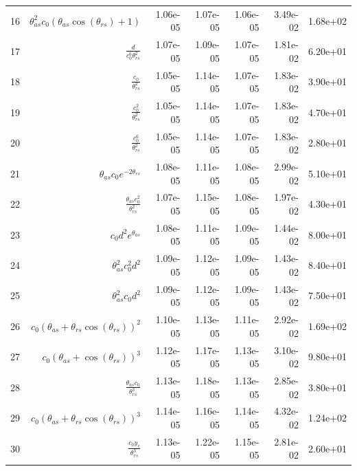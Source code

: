 \begin{tabularx}{\textwidth}{lRRRRRl}
16  &  $ \theta_{as}^{2} c_{0} \left(\theta_{as} \cos{\left(\theta_{rs} \right)} + 1\right) $  &  1.06e-05  &  1.07e-05  &  1.06e-05  &  3.49e-02  &  1.68e+02  \\ 
17  &  $ \displaystyle\frac{d}{c_{0}^{6} \theta_{rs}^{2}} $  &  1.07e-05  &  1.09e-05  &  1.07e-05  &  1.81e-02  &  6.20e+01  \\ 
18  &  $ \displaystyle\frac{c_{0}}{\theta_{rs}^{2}} $  &  1.05e-05  &  1.14e-05  &  1.07e-05  &  1.83e-02  &  3.90e+01  \\ 
19  &  $ \displaystyle\frac{c_{0}^{2}}{\theta_{rs}^{2}} $  &  1.05e-05  &  1.14e-05  &  1.07e-05  &  1.83e-02  &  4.70e+01  \\ 
20  &  $ \displaystyle\frac{c_{0}^{6}}{\theta_{rs}^{2}} $  &  1.05e-05  &  1.14e-05  &  1.07e-05  &  1.83e-02  &  2.80e+01  \\ 
21  &  $ \theta_{as} c_{0} e^{- 2 \theta_{rs}} $  &  1.08e-05  &  1.11e-05  &  1.08e-05  &  2.99e-02  &  5.10e+01  \\ 
22  &  $ \displaystyle\frac{\theta_{as} c_{0}^{2}}{\theta_{rs}^{2}} $  &  1.07e-05  &  1.15e-05  &  1.08e-05  &  1.97e-02  &  4.30e+01  \\ 
23  &  $ c_{0} d^{2} e^{\theta_{as}} $  &  1.08e-05  &  1.11e-05  &  1.09e-05  &  1.44e-02  &  8.00e+01  \\ 
24  &  $ \theta_{as}^{2} c_{0}^{2} d^{2} $  &  1.09e-05  &  1.12e-05  &  1.09e-05  &  1.43e-02  &  8.40e+01  \\ 
25  &  $ \theta_{as}^{2} c_{0} d^{2} $  &  1.09e-05  &  1.12e-05  &  1.09e-05  &  1.43e-02  &  7.50e+01  \\ 
26  &  $ c_{0} \left(\theta_{as} + \theta_{rs} \cos{\left(\theta_{rs} \right)}\right)^{2} $  &  1.10e-05  &  1.13e-05  &  1.11e-05  &  2.92e-02  &  1.69e+02  \\ 
27  &  $ c_{0} \left(\theta_{as} + \cos{\left(\theta_{rs} \right)}\right)^{3} $  &  1.12e-05  &  1.17e-05  &  1.13e-05  &  3.10e-02  &  9.80e+01  \\ 
28  &  $ \displaystyle\frac{\theta_{as} c_{0}}{\theta_{rs}^{3}} $  &  1.13e-05  &  1.18e-05  &  1.13e-05  &  2.85e-02  &  3.80e+01  \\ 
29  &  $ c_{0} \left(\theta_{as} + \theta_{rs} \cos{\left(\theta_{rs} \right)}\right)^{3} $  &  1.14e-05  &  1.16e-05  &  1.14e-05  &  4.32e-02  &  1.24e+02  \\ 
30  &  $ \displaystyle\frac{c_{0} y_c}{\theta_{rs}^{3}} $  &  1.13e-05  &  1.22e-05  &  1.15e-05  &  2.81e-02  &  2.60e+01  \\ 

\end{tabularx}
